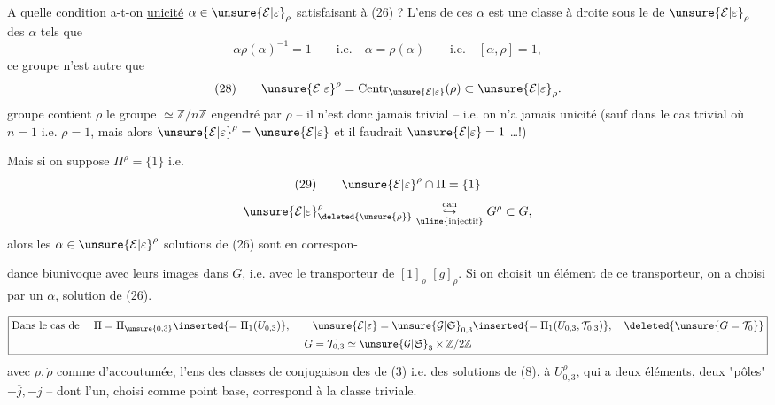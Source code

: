 A quelle condition a-t-on \uline{unicité}  $\alpha\in\unsure{\mathcal E|\varepsilon}_\rho$ satisfaisant à (26) ?
L'ens de ces $\alpha$ est une classe à droite sous le  de $\unsure{\mathcal E|\varepsilon}_\rho$  des $\alpha$ tels que 
\[
\alpha\rho(\alpha)^{-1}=1\qquad\text{i.e.}\quad
\alpha=\rho(\alpha)\qquad\text{i.e.}\quad[\alpha,\rho]=1,
\]
ce groupe n'est autre que 
\[
(28)\qquad\unsure{\mathcal E|\varepsilon}^\rho=\operatorname{Centr}_{\unsure{\mathcal E|\varepsilon}}(\rho)\subset\unsure{\mathcal E|\varepsilon}_\rho.
\]
 groupe contient $\rho$  le groupe $\simeq\mathbb Z/n\mathbb Z$  engendré par $\rho$ -- il n'est donc jamais trivial -- i.e. on n'a jamais unicité (sauf dans le cas trivial où \deleted{\unsure{$\rho$}} $n=1$ i.e. $\rho=1$,  mais alors $\unsure{\mathcal E|\varepsilon}^\rho=\unsure{\mathcal E|\varepsilon}$ et il faudrait $\unsure{\mathcal E|\varepsilon}=1$ \dots !)

Mais si on suppose $\Pi^\rho=\{1\}$ i.e.
\[
(29)\qquad\unsure{\mathcal E|\varepsilon}^\rho\cap\Pi=\{1\}
\]
\[
\unsure{\mathcal E|\varepsilon}^\rho_{\deleted{\unsure{\rho}}}
\underset{\uline{\text{injectif}}}{\overset{\mathrm{can}}{\hookrightarrow}}
G^\rho\subset G,
\]
alors les $\alpha\in\unsure{\mathcal E|\varepsilon}^\rho$ solutions de (26) sont en correspon-


dance biunivoque avec leurs images \inserted{$\dot\alpha$} dans $G$, i.e. avec le transporteur  de $[1]_\rho$  $[g]_\rho$.
Si on choisit un élément de ce transporteur, on a choisi par  un $\alpha$, solution de (26).

\[
\boxed{\begin{gathered}
\text{Dans le cas de }\quad
\Pi=\Pi_{\unsure{0,3}}\inserted{=\Pi_1(U_{0,3})},\qquad
\unsure{\mathcal E|\varepsilon}=\unsure{\mathcal G|\mathfrak S}_{0,3}
\inserted{=\Pi_1(U_{0,3},\mathcal T_{0,3})},
\quad\deleted{\unsure{G=\mathcal T_0}}\\
G=\mathcal T_{0,3}\simeq\unsure{\mathcal G|\mathfrak S}_3\times\mathbb Z/2\mathbb Z
\end{gathered}}
\]
avec $\rho,\dot\rho$ comme d'accoutumée, l'ens des classes de conjugaison des  de (3) i.e. des solutions de (8),  à $U_{0,3}^{\dot\rho}$, qui a deux éléments,  deux "pôles" $-\overline j,-j$ -- dont l'un, choisi comme point base, correspond à la classe triviale.

